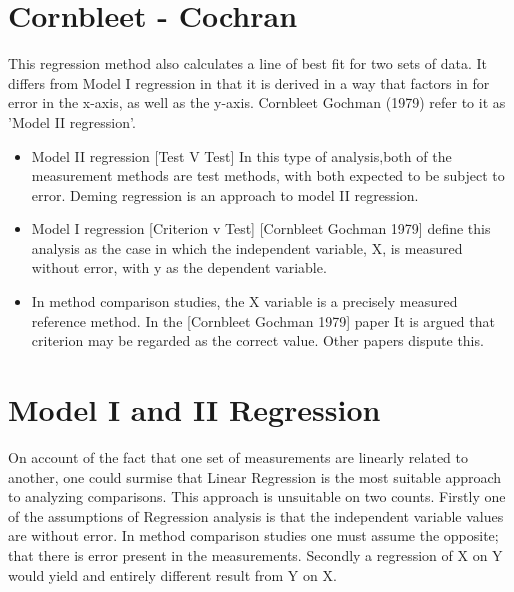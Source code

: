 \documentclass[12pt, a4paper]{report}
\theoremstyle{plain}
\theoremstyle{definition}
\theoremstyle{remark}
\begin{document}
\section{Cornbleet - Cochran }
This regression method also calculates a line of best fit for two sets of data. It differs from Model I regression in that it is derived in a way that factors in for error in the x-axis, as well as the y-axis. Cornbleet Gochman (1979) refer to it as 'Model II regression'.

\begin{itemize}
\item Model II regression [Test V Test] In this type of analysis,both of the measurement methods are test methods, with both expected to be subject to error. Deming regression is an approach to model II regression.

\item Model I regression [Criterion v Test] [Cornbleet Gochman 1979] define this analysis as the case in which the independent variable, X, is measured without error, with y as the dependent
variable.

\item In method comparison studies, the X variable is a precisely measured reference method. In the [Cornbleet Gochman 1979] paper It is argued that criterion may be regarded as the correct value.
Other papers dispute this.
\end{itemize}






\section{Model I and II Regression}

On account of the fact that one set of measurements are linearly related to another, one could surmise that Linear Regression is the most suitable approach to analyzing comparisons. This approach is unsuitable on two counts. Firstly one of the assumptions of Regression analysis is that the independent variable values are without error. In method comparison studies one must assume the opposite; that there is error present in the measurements. Secondly a regression of X on Y would yield and entirely different result from Y on X.
\end{document}
